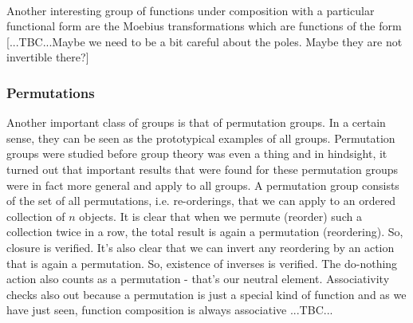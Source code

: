 \paragraph{} Another interesting group of functions under composition with a particular functional form are the Moebius transformations which are functions of the form [...TBC...Maybe we need to be a bit careful about the poles. Maybe they are not invertible there?]


\subsubsection{Permutations}
Another important class of groups is that of permutation groups. In a certain sense, they can be seen as the prototypical examples of all groups. Permutation groups were studied before group theory was even a thing and in hindsight, it turned out that important results that were found for these permutation groups were in fact more general and apply to all groups. A permutation group consists of the set of all permutations, i.e. re-orderings, that we can apply to an ordered collection of $n$ objects. It is clear that when we permute (reorder) such a collection twice in a row, the total result is again a permutation (reordering). So, closure is verified. It's also clear that we can invert any reordering by an action that is again a permutation. So, existence of inverses is verified. The do-nothing action also counts as a permutation - that's our neutral element. Associativity checks also out because a permutation is just a special kind of function and as we have just seen, function composition is always associative ...TBC...






